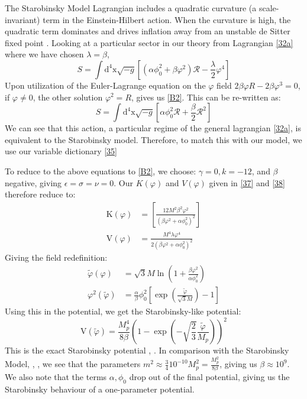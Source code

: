 \documentclass[aps,prd,reprint,preprintnumbers,showpacs,floatfix,nofootinbib,superscript address]{revtex4-2}
\begin{document}
The Starobinsky Model \cite{STAROBINSKY198099} Lagrangian includes a quadratic curvature (a scale-invariant) term in the Einstein-Hilbert action. When the curvature is high, the quadratic term dominates and drives inflation away from an unstable de Sitter fixed point \cite{Cecchini_2024}. Looking at a particular sector in our theory from Lagrangian \ref{32a} where we have chosen $\lambda = \beta$,
\begin{equation} \label{B1}
    S =\int \text{d}^4\text{x} \sqrt{-g} \left[ (\alpha \phi_0^2 + \beta \varphi^2)\mathcal{R} - \frac{\lambda}{2} \varphi^4 \right]  
\end{equation}
Upon utilization of the Euler-Lagrange equation on the $\varphi$ field $2 \beta \varphi R - 2\beta \varphi^3 = 0$, if $\varphi \neq 0$, the other solution $\varphi^2 = R$, gives us \ref{B2}. This can be re-written as:
\begin{equation} \label{B2}
    S =\int \text{d}^4\text{x} \sqrt{-g} \left[ \alpha \phi_0^2 \mathcal{R} + \frac{\beta}{2} \mathcal{R}^2  \right]
\end{equation}
 We can see that this action, a particular regime of the general lagrangian \ref{32a}, is equivalent to the Starobinsky model. Therefore, to match this with our model, we use our variable dictionary \ref{35}

To reduce to the above equations to \ref{B2}, we choose: $\gamma = 0, k = -12$, and $\beta$ negative, giving $\epsilon = \sigma = \nu = 0$. Our $K(\varphi)$ and $V(\varphi)$ given in \ref{37} and \ref{38} therefore reduce to:
\begin{align}
    \text{K}(\varphi) &= \left[\frac{12 M^2 \beta^2 \varphi^2}{ (\beta \varphi^2 + \alpha \phi_0^2)^2}\right] \\
    \text{V}(\varphi) &= \frac{ M^4 \lambda \varphi^4}{2(\beta \varphi^2 + \alpha \phi_0^2)^2}    
\end{align}
Giving the field redefinition:
\begin{align}
    \tilde{\varphi}(\varphi) &= \sqrt{3}M \ln\left(1 + \frac{\beta \varphi^2}{\alpha \phi_0^2} \right) \nonumber \\
    \varphi^2(\tilde{\varphi}) &=  \frac{\alpha}{\beta} \phi_0^2\left [ \exp\left(\frac{\tilde{\varphi}}{\sqrt{3}M}\right) -1\right]
\end{align}
Using this in the potential, we get the Starobinsky-like potential:
\begin{equation}
    \text{V}(\tilde{\varphi}) = \frac{ M_p^4}{8 \beta}  \left(1 - \exp\left(-\sqrt{\frac{2}{3}}\frac{ \tilde{\varphi}}{ M_p}\right)\right)^2
\end{equation}
This is the exact Starobinsky potential \cite{STAROBINSKY198099}, \cite{maeda_inflation_1988}. In comparison with the Starobinsky Model, \cite{ivanov2022analytic}, \cite{lust2024starobinsky}, we see that the parameters $m^2 \approx \frac{3}{4} 10^{-10}M_p^2 =\frac{M_p^2}{8\beta}$, giving us $\beta \approx 10^{9}$. We also note that the terms $\alpha, \phi_0$ drop out of the final potential, giving us the Starobinsky behaviour of a one-parameter potential.
\end{document}
